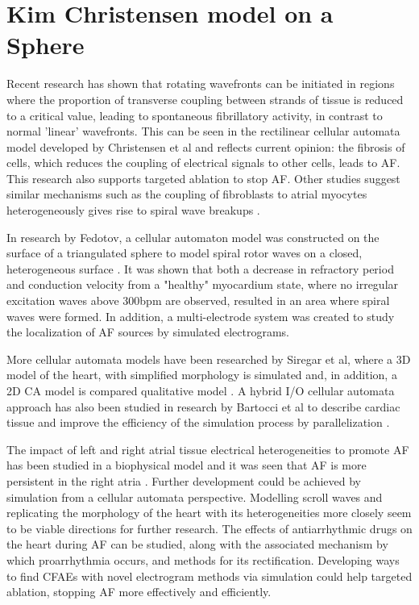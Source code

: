\documentclass[twocolumn, a1paper]{article}
\begin{document}
\section{\textbf{Kim Christensen model on a Sphere}}





Recent research has shown that rotating wavefronts can be initiated in regions where the proportion of transverse coupling between strands of tissue is reduced to a critical value, leading to spontaneous fibrillatory activity, in contrast to normal 'linear' wavefronts. This can be seen in the rectilinear cellular automata model developed by Christensen et al and reflects current opinion: the fibrosis of cells, which reduces the coupling of electrical signals to other cells, leads to AF\cite{Christensen}. This research also supports targeted ablation to stop AF. Other studies suggest similar mechanisms such as the coupling of fibroblasts to atrial myocytes heterogeneously gives rise to spiral wave breakups \cite{Ozawa}.


In research by Fedotov, a cellular automaton model was constructed on the surface of a triangulated sphere to model spiral rotor waves on a closed, heterogeneous surface \cite{Fedotov}. It was shown that both a decrease in refractory period and conduction velocity from a "healthy" myocardium state, where no irregular excitation waves above 300bpm are observed, resulted in an area where spiral waves were formed. In addition, a multi-electrode system was created to study the localization of AF sources by simulated electrograms. 


More cellular automata models have been researched by Siregar et al, where a 3D model of the heart, with simplified morphology is simulated and, in addition, a 2D CA model is compared qualitative model \cite{Siregar} \cite{Siregar2}. A hybrid I/O cellular automata approach has also been studied in research by Bartocci et al to describe cardiac tissue and improve the efficiency of the simulation process by parallelization \cite{Bartocci}.

 The impact of left and right atrial tissue electrical heterogeneities to promote AF has been studied in a biophysical model and it was seen that AF is more persistent in the right atria \cite{Luca}. Further development could be achieved by simulation from a cellular automata perspective. Modelling scroll waves and replicating the morphology of the heart with its heterogeneities more closely seem to be viable directions for further research. The effects of antiarrhythmic drugs on the heart during AF can be studied, along with the associated mechanism by which proarrhythmia occurs, and methods for its rectification. Developing ways to find CFAEs with novel electrogram methods via simulation could help targeted ablation, stopping AF more effectively and efficiently. 
\end{document}
